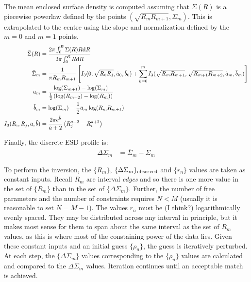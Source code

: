 \documentclass{article}
\begin{document}
The mean enclosed surface density is computed assuming that $\Sigma(R)$ is a piecewise powerlaw defined by the points $(\sqrt{R_mR_{m+1}}, \Sigma_m)$. This is extrapolated to the centre using the slope and normalization defined by the $m=0$ and $m=1$ points.
\begin{align}
  \bar{\Sigma}(R) &= \frac{2\pi\int_0^R\Sigma(R)R{\rm d}R}{2\pi\int_0^RR{\rm d}R}\\
  \bar{\Sigma}_m &= \frac{1}{\pi R_mR_{m+1}}\left[I_3(0, \sqrt{R_0R_1}, \tilde{a}_0, \tilde{b}_0) + \sum_{k=0}^m I_3(\sqrt{R_mR_{m+1}},\sqrt{R_{m+1}R_{m+2}}, \tilde{a}_m, \tilde{b}_m)\right]\label{eq-barSigmam}\\
  \tilde{a}_m &= \frac{\log(\Sigma_{m+1})-\log(\Sigma_m)}{\frac{1}{2}\left(\log(R_{m+2})-\log(R_m)\right)}\\
  \tilde{b}_m &= \log(\Sigma_m) - \frac{1}{2}\tilde{a}_m\log(R_mR_{m+1})\\
  I_3(R_i,R_j,\tilde{a},\tilde{b}) &= \frac{2\pi e^{\tilde{b}}}{\tilde{a}+2}\left(R_j^{a+2} - R_i^{a+2}\right)
\end{align}

Finally, the discrete ESD profile is:
\begin{align}
  \Delta\Sigma_m &= \bar{\Sigma}_m - \Sigma_m
\end{align}

To perform the inversion, the $\{R_m\}$, $\{\Delta\Sigma_m\}_{\rm observed}$ and $\{r_n\}$ values are taken as constant inputs. Recall $R_m$ are interval \emph{edges} and so there is one more value in the set of $\{R_m\}$ than in the set of $\{\Delta\Sigma_m\}$. Further, the number of free parameters and the number of constraints requires $N < M$ (usually it is reasonable to set $N=M-1$). The values $r_n$ must be (I think?) logarithmically evenly spaced. They may be distributed across any interval in principle, but it makes most sense for them to span about the same interval as the set of ${R_m}$ values, as this is where most of the constaining power of the data lies. Given these constant inputs and an initial guess $\{\rho_n\}$, the guess is iteratively perturbed. At each step, the $\{\Delta\Sigma_m\}$ values corresponding to the $\{\rho_n\}$ values are calculated and compared to the ${\Delta\Sigma_m}$ values. Iteration continues until an acceptable match is achieved.
\end{document}
